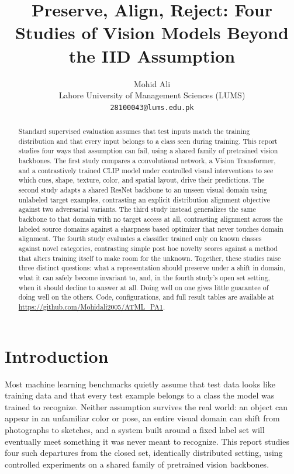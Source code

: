 \documentclass{article}
\title{Preserve, Align, Reject: Four Studies of Vision Models Beyond the IID Assumption}
\author{
  Mohid Ali \\
  Lahore University of Management Sciences (LUMS) \\
  \texttt{28100043@lums.edu.pk}
}
\begin{document}
\maketitle

\begin{abstract}
Standard supervised evaluation assumes that test inputs match the training
distribution and that every input belongs to a class seen during training.
This report studies four ways that assumption can fail, using a shared
family of pretrained vision backbones. The first study compares a
convolutional network, a Vision Transformer, and a contrastively trained
CLIP model under controlled
visual interventions to see which cues, shape, texture, color, and spatial
layout, drive their predictions. The second study adapts a shared
ResNet backbone to an unseen visual domain using unlabeled target examples,
contrasting an explicit distribution alignment objective against two
adversarial variants. The third study instead generalizes the same backbone
to that domain with no target access at all, contrasting alignment across
the labeled source domains against a sharpness based optimizer that never
touches domain alignment. The fourth study evaluates a classifier trained
only on known classes against novel categories, contrasting simple
post hoc novelty scores against a method that alters training itself to
make room for the unknown. Together, these studies raise three distinct
questions: what a representation should preserve under a shift in domain,
what it can safely become invariant to, and, in the fourth study's
open set setting, when it should decline to answer at all. Doing well on
one gives little guarantee of doing well on the others. Code,
configurations, and full result tables are available at
\url{https://github.com/Mohidali2005/ATML_PA1}.
\end{abstract}

\section{Introduction}
\label{sec:intro}

Most machine learning benchmarks quietly assume that test data looks like
training data and that every test example belongs to a class the model was
trained to recognize. Neither assumption survives the real world: an object can
appear in an unfamiliar color or pose, an entire visual domain can shift
from photographs to sketches, and a system built around a fixed label set
will eventually meet something it was never meant to recognize. This report
studies four such departures from the closed set, identically distributed
setting, using controlled experiments on a shared family of pretrained
vision backbones.
\end{document}
